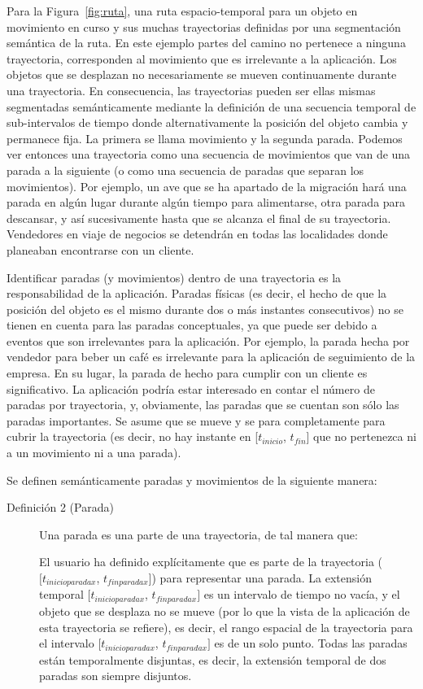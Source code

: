 Para la Figura~\ref{fig:ruta}, una ruta espacio-temporal para un objeto en movimiento
en curso y sus muchas trayectorias definidas por una segmentación semántica de la ruta. En este ejemplo partes del
camino no pertenece a ninguna trayectoria, corresponden al movimiento que es irrelevante a la aplicación.
Los objetos que se desplazan no necesariamente se mueven continuamente durante una trayectoria. En consecuencia, las
trayectorias pueden ser ellas mismas segmentadas semánticamente mediante la definición de una secuencia temporal de
sub-intervalos de tiempo donde alternativamente la posición del objeto cambia y permanece fija. La primera se llama
movimiento y la segunda parada. Podemos ver entonces una trayectoria como una secuencia de movimientos que van de
una parada a la siguiente (o como una secuencia de paradas que separan los movimientos). Por ejemplo, un ave que se
ha apartado de la migración hará una parada en algún lugar durante algún tiempo para alimentarse, otra parada para
descansar, y así sucesivamente hasta que se alcanza el final de su trayectoria. Vendedores en viaje de negocios se
detendrán en todas las localidades donde planeaban encontrarse con un cliente.

Identificar paradas (y movimientos) dentro de una trayectoria es la responsabilidad de la aplicación. Paradas 
físicas (es decir, el hecho de que la posición del objeto es el mismo durante dos o más instantes consecutivos)
no se tienen en cuenta para las paradas conceptuales, ya que puede ser debido a eventos que son irrelevantes 
para la aplicación. Por ejemplo, la parada hecha por vendedor para beber un café es irrelevante para la
aplicación de seguimiento de la empresa. En su lugar, la parada de hecho para cumplir con 
un cliente es significativo. La aplicación podría estar interesado en contar el número 
de paradas por trayectoria, y, obviamente, las paradas que se cuentan son sólo las paradas
importantes. Se asume que se mueve y se para completamente para cubrir la trayectoria (es decir, 
no hay instante en [$t_{inicio}$, $t_{fin}$] que
no pertenezca ni a un movimiento ni a una parada).

Se definen semánticamente paradas y movimientos de la siguiente manera:

\begin{description}
 \item [Definición 2 (Parada)] Una parada es una parte de una trayectoria, de tal manera que:

El usuario ha definido explícitamente que es parte de la trayectoria ($[t_{inicioparadax}$, $t_{finparadax}]$) 
para representar una parada. La extensión temporal $[t_{inicioparadax}$, $t_{finparadax}]$ es un intervalo de tiempo
no vacía, y el objeto que se desplaza no se mueve (por lo que la vista de la aplicación de esta 
trayectoria se refiere), es decir, el rango espacial de la trayectoria para el intervalo 
$[t_{inicioparadax}$, $t_{finparadax}]$ es de un solo punto. Todas las paradas están temporalmente
disjuntas, es decir, la extensión temporal de dos paradas son siempre disjuntos.
\end{description}



